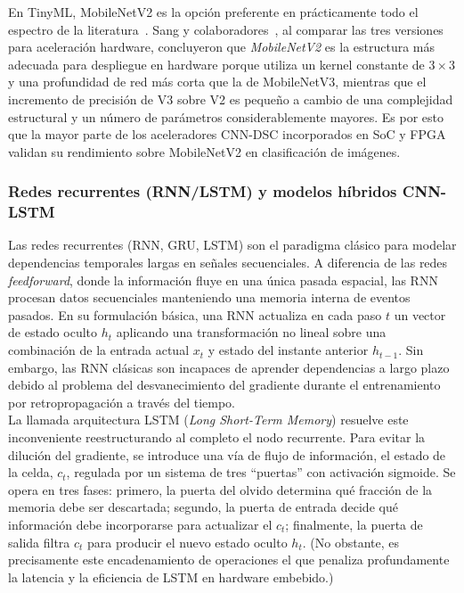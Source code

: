 \documentclass[a4paper,12pt,twoside,final]{book}
\begin{document}
En TinyML, MobileNetV2 es la opción preferente en prácticamente todo el espectro de la
literatura~\cite{somvanshi2025acm}. Sang y colaboradores~\cite{sang2023jrtip}, al comparar las tres versiones para
aceleración hardware, concluyeron que \textit{MobileNetV2} es la estructura más adecuada para despliegue en hardware
porque utiliza un kernel constante de $3\times 3$ y una profundidad de red más corta que la de MobileNetV3, mientras
que el incremento de precisión de V3 sobre V2 es pequeño a cambio de una complejidad estructural y un número de
parámetros considerablemente mayores. Es por esto que la mayor parte de los aceleradores CNN-DSC incorporados en SoC
y FPGA validan su rendimiento sobre MobileNetV2 en clasificación de imágenes.

\subsubsection{Redes recurrentes (RNN/LSTM) y modelos híbridos CNN-LSTM}
Las redes recurrentes (RNN, GRU, LSTM) son el paradigma clásico para modelar dependencias temporales largas en
señales secuenciales. A diferencia de las redes \textit{feedforward}, donde la información fluye en una única pasada
espacial, las RNN procesan datos secuenciales manteniendo una memoria interna de eventos pasados. En su formulación
básica, una RNN actualiza en cada paso $t$ un vector de estado oculto $h_t$ aplicando una transformación no lineal
sobre una combinación de la entrada actual $x_t$ y estado del instante anterior $h_{t-1}$. Sin embargo, las RNN
clásicas son incapaces de aprender dependencias a largo plazo debido al problema del desvanecimiento del gradiente
durante el entrenamiento por retropropagación a través del tiempo.\\

La llamada arquitectura LSTM (\textit{Long Short-Term Memory}) resuelve este inconveniente reestructurando al completo
el nodo recurrente. Para evitar la dilución del gradiente, se introduce una vía de flujo de información, el estado de
la celda, $c_t$, regulada por un sistema de tres ``puertas'' con activación sigmoide. Se opera en tres fases: primero,
la puerta del olvido determina qué fracción de la memoria debe ser descartada; segundo, la puerta de entrada decide
qué información debe incorporarse para actualizar el $c_t$; finalmente, la puerta de salida filtra $c_t$ para producir
el nuevo estado oculto $h_t$. (No obstante, es precisamente este encadenamiento de operaciones el que penaliza
profundamente la latencia y la eficiencia de LSTM en hardware embebido.)\\
\end{document}
